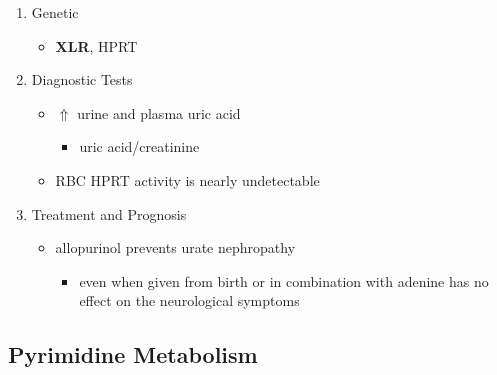 \documentclass{scrartcl}
\begin{document}
\begin{enumerate}
\item Genetic
\label{sec:org50892b9}
\begin{itemize}
\item \textbf{XLR}, HPRT
\end{itemize}

\item Diagnostic Tests
\label{sec:org5cf7da1}
\begin{itemize}
\item \(\Uparrow\) urine and plasma uric acid
\begin{itemize}
\item uric acid/creatinine
\end{itemize}
\item RBC HPRT activity is nearly undetectable
\end{itemize}

\item Treatment and Prognosis
\label{sec:orgb6484f8}
\begin{itemize}
\item allopurinol prevents urate nephropathy
\begin{itemize}
\item even when given from birth or in combination with adenine has no
effect on the neurological symptoms
\end{itemize}
\end{itemize}
\end{enumerate}

\subsection{Pyrimidine Metabolism}
\label{sec:orgadf1e97}
\end{document}
